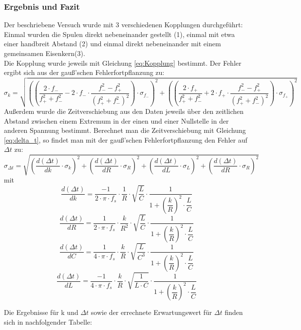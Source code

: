 \documentclass[12pt,a4paper]{article}
\begin{document}
\subsubsection{Ergebnis und Fazit}
Der beschriebene Versuch wurde mit 3 verschiedenen Kopplungen durchgeführt: Einmal wurden die Spulen direkt nebeneinander gestellt (1), einmal mit etwa einer handbreit Abstand (2) und einmal direkt nebeneinander mit einem gemeinsamen Eisenkern(3). \\
Die Kopplung wurde jeweils mit Gleichung \ref{eq:Kopplung} bestimmt. Der Fehler ergibt sich aus der gauß'schen Fehlerfortpflanzung zu:
\begin{equation}
\sigma_k = \sqrt{\left( \left( \dfrac{2 \cdot f_-}{f_+^2 + f_-^2} - 2 \cdot f_- \cdot \dfrac{f_-^2 - f_+^2}{(f_+^2 + f_-^2)^2} \right) \cdot \sigma_{f_-} \right)^2 + \left( \left( \dfrac{2 \cdot f_+}{f_+^2 + f_-^2} + 2 \cdot f_+ \cdot \dfrac{f_-^2 - f_+^2}{(f_+^2 + f_-^2)^2} \right) \cdot \sigma_{f_+} \right)^2}
\end{equation}
Außerdem wurde die Zeitverschiebung aus den Daten jeweils über den zeitlichen Abstand zwischen einem Extremum in der einen und einer Nullstelle in der anderen Spannung bestimmt. Berechnet man die Zeitverschiebung mit Gleichung \ref{eq:delta_t}, so findet man mit der gauß'schen Fehlerfortpflanzung den Fehler auf $\Delta t$ zu:
\begin{equation}
\sigma_{\Delta t} = \sqrt{\left( \dfrac{d(\Delta t)}{dk} \cdot \sigma_k \right)^2 + \left( \dfrac{d(\Delta t)}{dR} \cdot \sigma_R \right)^2 + \left( \dfrac{d(\Delta t)}{dL} \cdot \sigma_L \right)^2 + \left( \dfrac{d(\Delta t)}{dR} \cdot \sigma_R \right)^2}
\end{equation}
mit
\[\dfrac{d(\Delta t)}{dk} = \dfrac{-1}{2 \cdot \pi \cdot f_s} \cdot \dfrac{1}{R} \cdot \sqrt{\dfrac{L}{C}} \cdot \dfrac{1}{1 + \left( \dfrac{k}{R} \right)^2 \cdot \dfrac{L}{C}} \]
\[\dfrac{d(\Delta t)}{dR} = \dfrac{1}{2 \cdot \pi \cdot f_s} \cdot \dfrac{k}{R^2} \cdot \sqrt{\dfrac{L}{C}} \cdot \dfrac{1}{1 + \left( \dfrac{k}{R} \right)^2 \cdot \dfrac{L}{C}} \]
\[\dfrac{d(\Delta t)}{dC} = \dfrac{1}{4 \cdot \pi \cdot f_s} \cdot \dfrac{k}{R} \cdot \sqrt{\dfrac{L}{C^3}} \cdot \dfrac{1}{1 + \left( \dfrac{k}{R} \right)^2 \cdot \dfrac{L}{C}} \]
\[\dfrac{d(\Delta t)}{dL} = \dfrac{-1}{4 \cdot \pi \cdot f_s} \cdot \dfrac{k}{R} \cdot \sqrt{\dfrac{1}{L \cdot C}} \cdot \dfrac{1}{1 + \left( \dfrac{k}{R} \right)^2 \cdot \dfrac{L}{C}} \]

Die Ergebnisse für k und $\Delta t$ sowie der errechnete Erwartungswert für $\Delta t$ finden sich in nachfolgender Tabelle: \\
\end{document}

